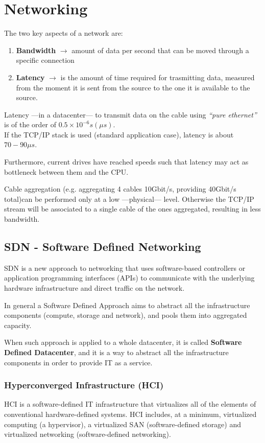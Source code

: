 \chapter{Networking}
The two key aspects of a network are:
\begin{enumerate}
   \item \textbf{Bandwidth} $\longrightarrow$ amount of data per second that can be moved through a specific connection
   \item \textbf{Latency} $\longrightarrow$ is the amount of time required for trasmitting data, measured from the moment it is sent from the source to the one it is available to the source.
\end{enumerate}
Latency ---in a datacenter--- to transmit data on the cable using \textit{``pure ethernet''} is of the order of $0.5\times10^{-6}s (\mu s)$.\\
If the TCP/IP stack is used (standard application case), latency is about $70-90\mu s$.

Furthermore, current drives have reached speeds such that latency may act as bottleneck between them and the CPU.

Cable aggregation (e.g. aggregating 4 cables 10Gbit/s, providing 40Gbit/s total)can be performed only at a low ---physical--- level. Otherwise the TCP/IP stream will be associated to a single cable of the ones aggregated, resulting in less bandwidth.

\section{SDN - Software Defined Networking}
SDN is a new approach to networking that uses software-based controllers or application programming interfaces (APIs) to communicate with the underlying hardware infrastructure and direct traffic on the network.

In general a Software Defined Approach aims to abstract all the infrastructure components (compute, storage and network), and pools them into aggregated capacity.

When such approach is applied to a whole datacenter, it is called \textbf{Software Defined Datacenter}, and it is a way to abstract all the infrastructure components in order to provide IT as a service.

\subsection{Hyperconverged Infrastructure (HCI)}
HCI is a software-defined IT infrastructure that virtualizes all of the elements of conventional hardware-defined systems. HCI includes, at a minimum, virtualized computing (a hypervisor), a virtualized SAN (software-defined storage) and virtualized networking (software-defined networking).

